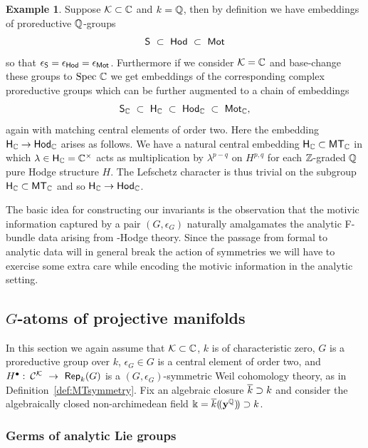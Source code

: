 \documentclass[twoside,leqno]{article}
\numberwithin{equation}{section}
\theoremstyle{plain}
\theoremstyle{definition}
\newtheorem{example}[equation]{Example}
\begin{document}
\begin{example} \label{ex:compareG} 
Suppose $\mathcal K \subset \mathbb C$ and $k = \mathbb Q$, then by definition we have embeddings of proreductive $\mathbb Q$-groups  
\[
\ztwogr \ \subset \ \hodge \ \subset \ \motM 
\]
so that $\epsilon_{\mathsf{S}} = \epsilon_{\mathsf{Hod}} = \epsilon_{\mathsf{Mot}}$. Furthermore if we consider 
$\mathcal K = \mathbb C$ and base-change these groups to $\operatorname{Spec} \, \mathbb C$  we get embeddings of the corresponding  complex proreductive groups 
which can be further augmented to a chain of embeddings 
\[
\mathsf{S}_{\mathbb C} \ \subset \ \mathsf{H}_{\mathbb C} \ \subset \ \mathsf{Hod}_{\mathbb C} \ \subset \ \mathsf{Mot}_{\mathbb C},
\]
again with matching central elements of order two. Here the embedding 
$\mathsf{H}_{\mathbb C}  \to \mathsf{Hod}_{\mathbb C}$ arises as follows. We have a natural central embedding 
$\mathsf{H}_{\mathbb C} \subset \mathsf{MT}_{\mathbb C}$ in which $\lambda \in \mathsf{H}_{\mathbb C} = \mathbb C^{\times}$ acts as multiplication by $\lambda^{p-q}$ on $H^{p,q}$ for each $\mathbb Z$-graded $\mathbb Q$ pure Hodge structure $H$. The Lefschetz character is thus trivial on the subgroup $\mathsf{H}_{\mathbb C} \subset \mathsf{MT}_{\mathbb C}$ and so $\mathsf{H}_{\mathbb C}  \to \mathsf{Hod}_{\mathbb C}$.
\end{example}


The basic idea for constructing our invariants is the observation that the motivic information captured by a pair $(G,\epsilon_{G})$ naturally amalgamates the analytic F-bundle data arising from \nc-Hodge theory. Since the passage from formal to analytic data will in general break the action of symmetries we will have to exercise  some extra care while encoding the motivic information in the analytic setting.


\subsection{\texorpdfstring{$G$}{G}-atoms of projective manifolds} \label{sec:Gatoms_proj}

In this section we again assume that  $\mathcal K \subset \mathbb C$, $k$ is of characteristic zero, $G$ is a proreductive group over $k$, $\epsilon_{G} \in G$ is a central element of order two, and $H^{\bullet} \, \colon \, \CA{\kay} \ \to \ \mathsf{Rep}_{k}(G)$ is a $(G,\epsilon_{G})$-symmetric Weil cohomology theory, as in Definition~\ref{def:MTsymmetry}. Fix an algebraic closure $\overline{k} \supset k$ and consider  the algebraically closed non-archimedean field  $\Bbbk = \overline{k}(\!(\mathbf{y}^{\mathbb Q})\!) \supset k$.


\subsubsection{Germs of analytic Lie groups} \label{sss:germsG}
\end{document}
